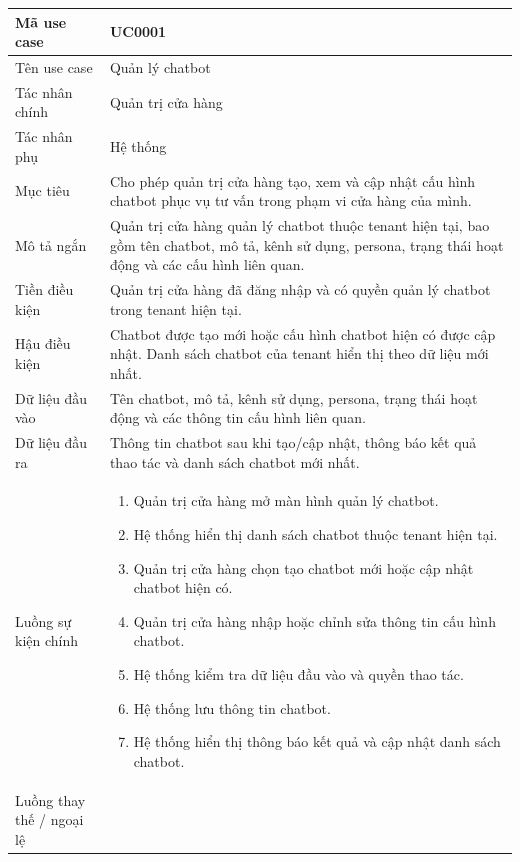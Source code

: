 \documentclass[../DoAn.tex]{subfiles}
\begin{document}
\begin{longtable}{|p{}|p{}|}
Mã use case & UC0001 \\
\hline
Tên use case & Quản lý chatbot \\
\hline
Tác nhân chính & Quản trị cửa hàng \\
\hline
Tác nhân phụ & Hệ thống \\
\hline
Mục tiêu & Cho phép quản trị cửa hàng tạo, xem và cập nhật cấu hình chatbot phục vụ tư vấn trong phạm vi cửa hàng của mình. \\
\hline
Mô tả ngắn & Quản trị cửa hàng quản lý chatbot thuộc tenant hiện tại, bao gồm tên chatbot, mô tả, kênh sử dụng, persona, trạng thái hoạt động và các cấu hình liên quan. \\
\hline
Tiền điều kiện & Quản trị cửa hàng đã đăng nhập và có quyền quản lý chatbot trong tenant hiện tại. \\
\hline
Hậu điều kiện & Chatbot được tạo mới hoặc cấu hình chatbot hiện có được cập nhật. Danh sách chatbot của tenant hiển thị theo dữ liệu mới nhất. \\
\hline
Dữ liệu đầu vào & Tên chatbot, mô tả, kênh sử dụng, persona, trạng thái hoạt động và các thông tin cấu hình liên quan. \\
\hline
Dữ liệu đầu ra & Thông tin chatbot sau khi tạo/cập nhật, thông báo kết quả thao tác và danh sách chatbot mới nhất. \\
\hline
Luồng sự kiện chính &
\begin{minipage}[t]{0.68\textwidth}
\begin{enumerate}
    \item Quản trị cửa hàng mở màn hình quản lý chatbot.
    \item Hệ thống hiển thị danh sách chatbot thuộc tenant hiện tại.
    \item Quản trị cửa hàng chọn tạo chatbot mới hoặc cập nhật chatbot hiện có.
    \item Quản trị cửa hàng nhập hoặc chỉnh sửa thông tin cấu hình chatbot.
    \item Hệ thống kiểm tra dữ liệu đầu vào và quyền thao tác.
    \item Hệ thống lưu thông tin chatbot.
    \item Hệ thống hiển thị thông báo kết quả và cập nhật danh sách chatbot.
\end{enumerate}
\end{minipage}
\\
\hline
Luồng thay thế / ngoại lệ &
\begin{minipage}[t]{0.68\textwidth}
\begin{itemize}

\end{itemize}
\end{minipage}
\end{longtable}
\end{document}
